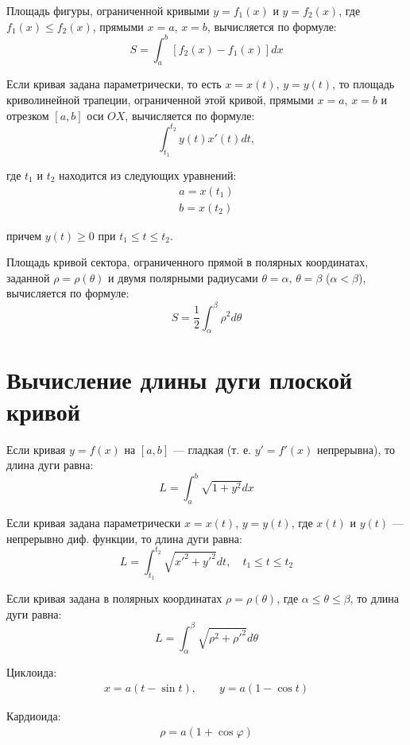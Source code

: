 \documentclass[a4paper,12pt,oneside]{extbook}
\theoremstyle{numbered}
\theoremstyle{unnumbered}
\theoremstyle{named}
\theoremstyle{unnumbered}
\theoremstyle{named}
\theoremstyle{named}
\theoremstyle{named}
\begin{document}
Площадь фигуры, ограниченной кривыми \(y = f_1(x)\) и \(y = f_2(x)\), где \(f_1(x) \leq f_2(x)\), прямыми \(x = a\), \(x = b\), вычисляется по формуле:
\[
    S = \int_a^b [f_2(x) - f_1(x)]dx
\]

Если кривая задана параметрически, то есть \(x = x(t)\), \(y = y(t)\), то площадь криволинейной трапеции, ограниченной этой кривой, прямыми \(x = a\), \(x = b\) и отрезком \([a, b]\) оси \(OX\), вычисляется по формуле:
\[
    \int_{t_1}^{t_2} y(t) x'(t) dt,
\]

где \(t_1\) и \(t_2\) находится из следующих уравнений:
\begin{gather*}
    a = x(t_1) \\
    b = x(t_2)
\end{gather*}

причем \(y(t) \geq 0\) при \(t_1 \leq t \leq t_2\).

Площадь кривой сектора, ограниченного прямой в полярных координатах, заданной \(\rho = \rho(\theta)\) и двумя полярными радиусами \(\theta = \alpha\), \(\theta = \beta\) (\(\alpha < \beta\)), вычисляется по формуле:
\[
    S = \frac{1}{2} \int_{\alpha}^{\beta} \rho^2 d\theta
\]

\section{Вычисление длины дуги плоской кривой}%
\label{sec:Вычисление длины дуги плоской кривой}

Если кривая \(y = f(x)\) на \([a, b]\) — гладкая (т. е. \(y' = f'(x)\) непрерывна), то длина дуги равна:
\[
    L = \int_a^b \sqrt{1 + y^2} dx
\]

Если кривая задана параметрически \(x = x(t)\), \(y = y(t)\), где \(x(t)\) и \(y(t)\) — непрерывно диф. функции, то длина дуги равна:
\[
    L = \int_{t_1}^{t_2} \sqrt{x'^2 + y'^2}dt, \quad t_1 \leq t \leq t_2
\]

Если кривая задана в полярных координатах \(\rho = \rho(\theta)\), где \(\alpha \leq \theta \leq \beta\), то длина дуги равна:
\[
    L = \int_{\alpha}^{\beta} \sqrt{\rho^2 + \rho'^2} d\theta
\]

Циклоида:
\begin{gather*}
    x = a(t - \sin{t}),
    \qquad
    y = a(1 - \cos{t})
\end{gather*}


Кардиоида:
\begin{gather*}
    \rho = a(1 + \cos{\varphi})
\end{gather*}
\end{document}
